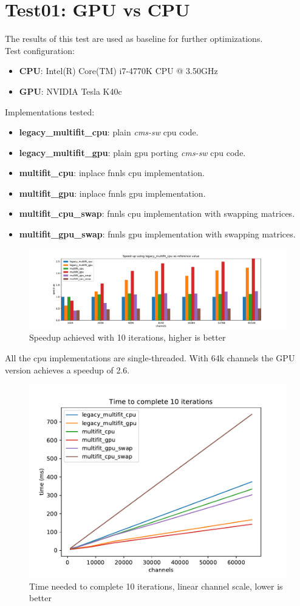 \section{Test01: GPU vs CPU}
The results of this test are used as baseline for further optimizations. \\
Test configuration:
\begin{itemize}
  \item \textbf{CPU}: Intel(R) Core(TM) i7-4770K CPU @ 3.50GHz 
  \item \textbf{GPU}: NVIDIA Tesla K40c 
\end{itemize}
Implementations tested:
\begin{itemize}
  \item \textbf{legacy\_multifit\_cpu}: plain \textit{cms-sw} cpu code.
  \item \textbf{legacy\_multifit\_gpu}: plain gpu porting \textit{cms-sw} cpu code.
  \item \textbf{multifit\_cpu}: inplace fnnls cpu implementation.
  \item \textbf{multifit\_gpu}: inplace fnnls gpu implementation.
  \item \textbf{multifit\_cpu\_swap}: fnnls cpu implementation with swapping matrices.
  \item \textbf{multifit\_gpu\_swap}: fnnls gpu implementation with swapping matrices.
\end{itemize}
\begin{figure}[h]
  \includegraphics[width=\textwidth]{img/speedup}
  \caption{Speedup achieved with 10 iterations, higher is better}
  \label{img:speedup01}
\end{figure}
All the cpu implementations are single-threaded. With 64k channels the GPU version achieves a speedup of 2.6. 
\begin{figure}[H]
  \includegraphics[width=.75\textwidth]{img/linscale}
  \caption{Time needed to complete 10 iterations, linear channel scale, lower is better}
  \label{img:linscale01}
\end{figure}
